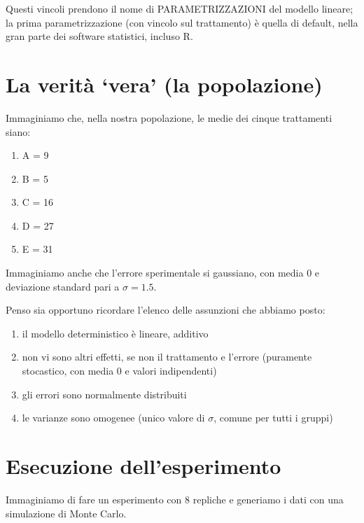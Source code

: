 \documentclass[a4paper,12pt,oneside]{book}
\providecommand{\tightlist}{%
  \setlength{\itemsep}{0pt}\setlength{\parskip}{0pt}}
\theoremstyle{definition}
\theoremstyle{definition}
\theoremstyle{definition}
\theoremstyle{remark}
\begin{document}
Questi vincoli prendono il nome di PARAMETRIZZAZIONI del modello
lineare; la prima parametrizzazione (con vincolo sul trattamento) è
quella di default, nella gran parte dei software statistici, incluso R.

\section{\texorpdfstring{La verità `vera' (la
popolazione)}{La verità vera (la popolazione)}}\label{la-verita-vera-la-popolazione}

Immaginiamo che, nella nostra popolazione, le medie dei cinque
trattamenti siano:

\begin{enumerate}
\def\labelenumi{\arabic{enumi}.}
\tightlist
\item
  A = 9
\item
  B = 5
\item
  C = 16
\item
  D = 27
\item
  E = 31
\end{enumerate}

Immaginiamo anche che l'errore sperimentale si gaussiano, con media 0 e
deviazione standard pari a \(\sigma = 1.5\).

Penso sia opportuno ricordare l'elenco delle assunzioni che abbiamo
posto:

\begin{enumerate}
\def\labelenumi{\arabic{enumi}.}
\tightlist
\item
  il modello deterministico è lineare, additivo
\item
  non vi sono altri effetti, se non il trattamento e l'errore (puramente
  stocastico, con media 0 e valori indipendenti)
\item
  gli errori sono normalmente distribuiti
\item
  le varianze sono omogenee (unico valore di \(\sigma\), comune per
  tutti i gruppi)
\end{enumerate}

\section{Esecuzione dell'esperimento}\label{esecuzione-dellesperimento}

Immaginiamo di fare un esperimento con 8 repliche e generiamo i dati con
una simulazione di Monte Carlo.
\end{document}
